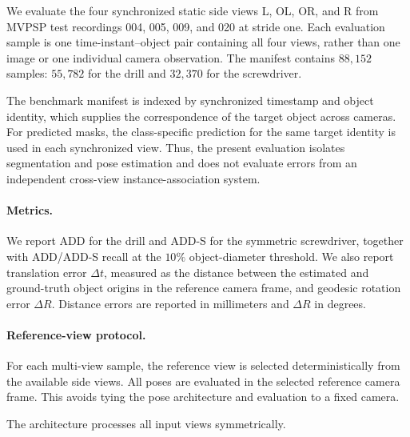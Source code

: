 We evaluate the four synchronized static side views L, OL, OR, and R from
MVPSP test recordings 004, 005, 009, and 020 at stride one.
Each evaluation sample is one time-instant--object pair containing all four
views, rather than one image or one individual camera observation.
The manifest contains \(88{,}152\) samples: \(55{,}782\) for the drill and
\(32{,}370\) for the screwdriver.

The benchmark manifest is indexed by synchronized timestamp and object
identity, which supplies the correspondence of the target object across
cameras.
For predicted masks, the class-specific prediction for the same target
identity is used in each synchronized view.
Thus, the present evaluation isolates segmentation and pose estimation and
does not evaluate errors from an independent cross-view instance-association
system.

\paragraph{Metrics.}
We report ADD for the drill and ADD-S for the symmetric screwdriver, together with ADD/ADD-S recall at the \(10\%\) object-diameter threshold.
We also report translation error \(\Delta t\), measured as the distance between the estimated and ground-truth object origins in the reference camera frame, and geodesic rotation error \(\Delta R\).
Distance errors are reported in millimeters and \(\Delta R\) in degrees.

\paragraph{Reference-view protocol.}
\label{sec:reference_view_protocol}
For each multi-view sample, the reference view is selected deterministically from the available side views.
All poses are evaluated in the selected reference camera frame.
This avoids tying the pose architecture and evaluation to a fixed camera.


\label{supp:reference_view}

The architecture processes all input views symmetrically.

